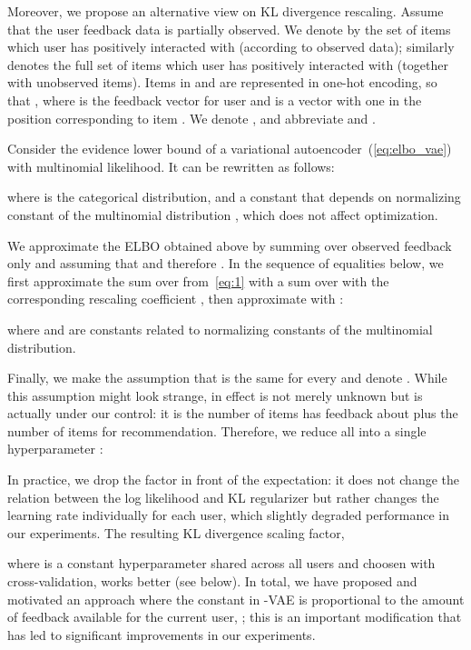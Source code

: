 \documentclass[sigconf,authorversion]{acmart}
\begin{document}
\def\klu{\mathrm{KL}_u}
\def\klf{\mathrm{KL}_u^f}

Moreover, we propose an alternative view on KL divergence rescaling. Assume that the user feedback data is partially observed. We denote by  the set of items which user  has positively interacted with (according to observed data);  similarly denotes the full set of items which user  has positively interacted with (together with unobserved items). Items in  and  are represented in one-hot encoding, so that , where  is the feedback vector for user  and  is a vector with one  in the position corresponding to item . We denote 
,  and abbreviate  and .

Consider the evidence lower bound of a variational autoencoder~(\ref{eq:elbo_vae}) with multinomial likelihood. It can be rewritten as follows:


where 
is the categorical distribution,
and  a constant that depends on normalizing constant of the multinomial distribution , which does not affect optimization.

We approximate the ELBO obtained above by summing over observed feedback only and assuming that  and therefore . In the sequence of equalities below, we first approximate the sum over  from~\eqref{eq:1} with a sum over  with the corresponding rescaling coefficient , then approximate  with :


where  and  are constants related to normalizing constants of the multinomial distribution.

Finally, we make the assumption that  is the same for every  and denote . While this assumption might look strange, in effect  is not merely unknown but is actually under our control: it is the number of items  has feedback about plus the number of items for recommendation. Therefore, we reduce all  into a single hyperparameter :


\noindent
In practice, we drop the  factor in front of the expectation: it does not change the relation between the log likelihood and KL regularizer but rather changes the learning rate individually for each user, which slightly degraded performance in our experiments.
The resulting KL divergence scaling factor, 


\noindent
where  is a constant hyperparameter shared across all users and choosen with cross-validation, works better (see below). 
In total, we have proposed and motivated an approach where the  constant in -VAE is proportional to the amount of feedback available for the current user, ; this is an important modification that has led to significant improvements in our experiments.
\end{document}
